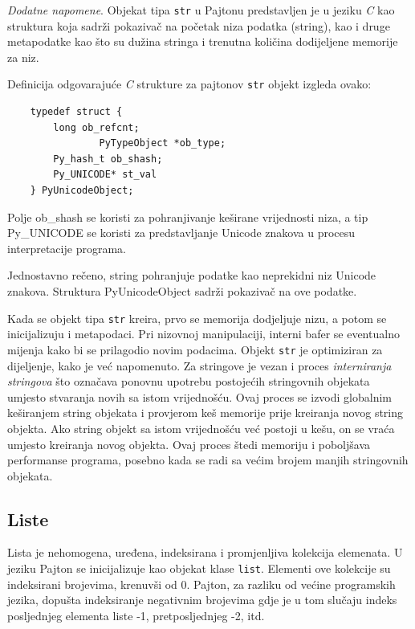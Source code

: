 \textit{Dodatne napomene}. Objekat tipa \texttt{str} u Pajtonu predstavljen je u jeziku \textit{C} kao struktura koja sadrži pokazivač na početak niza podatka (string), kao i druge metapodatke kao što su dužina stringa i trenutna količina dodijeljene memorije za niz.

Definicija odgovarajuće \textit{C} strukture za pajtonov \texttt{str} objekt izgleda ovako:

\begin{verbatim}
	typedef struct {
		long ob_refcnt;
                PyTypeObject *ob_type;
		Py_hash_t ob_shash;
		Py_UNICODE* st_val
	} PyUnicodeObject;
\end{verbatim}

Polje ob\_shash se koristi za pohranjivanje keširane vrijednosti niza, a tip Py\_UNICODE se koristi za predstavljanje Unicode znakova u procesu interpretacije programa. %
 
Jednostavno rečeno, string  pohranjuje  podatke kao neprekidni niz Unicode znakova. %
Struktura PyUnicodeObject sadrži pokazivač na ove podatke.


Kada se objekt tipa \texttt{str} kreira, prvo se memorija dodjeljuje nizu, a potom se inicijalizuju i metapodaci. Pri nizovnoj manipulaciji, interni bafer se eventualno mijenja kako bi se prilagodio novim podacima. Objekt \texttt{str} je   optimiziran za dijeljenje, kako je već napomenuto. %
 Za stringove je vezan i proces   \textit{interniranja stringova} što označava ponovnu upotrebu postojećih stringovnih objekata umjesto stvaranja novih sa istom vrijednošću. Ovaj proces se izvodi   globalnim keširanjem string objekata i provjerom    keš memorije prije kreiranja novog string objekta. Ako string objekt sa istom vrijednošću već postoji u kešu, on se vraća umjesto kreiranja novog objekta. Ovaj proces štedi memoriju i poboljšava performanse programa, posebno kada se radi sa većim brojem manjih stringovnih objekata.


\subsection{Liste}
Lista je nehomogena, uređena, indeksirana i promjenljiva kolekcija elemenata. U jeziku Pajton se inicijalizuje kao objekat klase \texttt{list}. Elementi ove kolekcije su indeksirani brojevima, krenuvši od 0. Pajton, za razliku od većine programskih jezika, dopušta indeksiranje negativnim brojevima gdje je u tom slučaju indeks posljednjeg elementa liste -1, pretposljednjeg -2, itd.  

